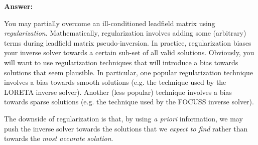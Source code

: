 \documentclass[a4paper,10pt,oneside]{article}
\begin{document}
\noindent \textbf{Answer:}

You may partially overcome an ill-conditioned leadfield matrix using \emph{regularization}. Mathematically, regularization involves adding some (arbitrary) terms during leadfield matrix pseudo-inversion. In practice, regularization biases your inverse solver towards a certain sub-set of all valid solutions. Obviously, you will want to use regularization techniques that will introduce a bias towards solutions that seem plausible. In particular, one popular regularization technique involves a bias towards smooth solutions (e.g. the technique used by the LORETA inverse solver). Another (less popular) technique involves a bias towards sparse solutions (e.g. the technique used by the FOCUSS inverse solver).

The downside of regularization is that, by using \emph{a priori} information, we may push the inverse solver towards the solutions that we \emph{expect to find} rather than towards the \emph{most accurate solution}. 
\end{document}
